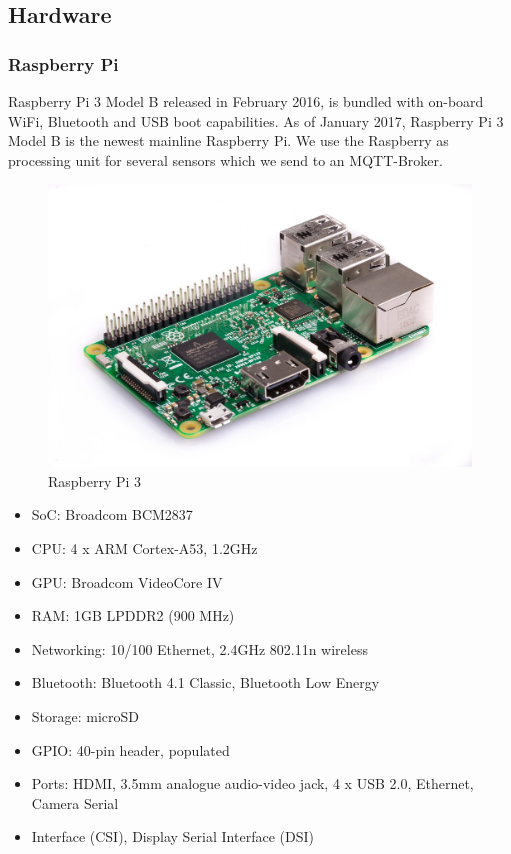\documentclass[12pt]{article}
\begin{document}
\subsection{Hardware}

\subsubsection{Raspberry Pi}
 Raspberry Pi 3 Model B released in February 2016, is bundled with on-board WiFi, Bluetooth and USB boot capabilities. As of January 2017, Raspberry Pi 3 Model B is the newest mainline Raspberry Pi. We use the Raspberry as processing unit for several sensors which we send to an MQTT-Broker. 
 
 \begin{figure}[H]
 	\includegraphics[width=0.7\linewidth]{Raspberry-pi-3}
 	\centering
 	\caption{Raspberry Pi 3}
 	\label{fig:raspberry-pi-3}
 \end{figure}
 
\begin{itemize}
\item SoC: Broadcom BCM2837
\item CPU: 4 x ARM Cortex-A53, 1.2GHz
\item GPU: Broadcom VideoCore IV
\item RAM: 1GB LPDDR2 (900 MHz)
\item Networking: 10/100 Ethernet, 2.4GHz 802.11n wireless
\item Bluetooth: Bluetooth 4.1 Classic, Bluetooth Low Energy
\item Storage: microSD
\item GPIO: 40-pin header, populated
\item Ports: HDMI, 3.5mm analogue audio-video jack, 4 x USB 2.0, Ethernet, Camera Serial 
\item Interface (CSI), Display Serial Interface (DSI)
\end{itemize}
\end{document}
